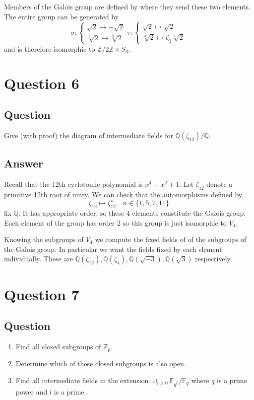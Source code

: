 \documentclass[11pt]{article}
\begin{document}
Members of the Galois group are defined  by where they send these two elements. The entire group can be generated by 
\[\sigma : \left\{ \begin{array}{c} \sqrt 2 \mapsto -\sqrt 2 \\ \sqrt[3]2 \mapsto \sqrt[3]2  \end{array}\right. \tau : \left\{ \begin{array}{c} \sqrt 2 \mapsto \sqrt 2 \\ \sqrt[3]2 \mapsto \zeta_3 \sqrt[3]2  \end{array}\right. \]
and is therefore isomorphic to $\mathbb{Z}/2 \mathbb{Z} \times S_3$.

\section{Question 6}
\subsection{Question}
Give (with proof) the diagram of intermediate fields for $\mathbb{Q}(\zeta_{12})/\mathbb{Q}$.
\subsection{Answer}
Recall that the 12th cyclotomic polynomial is $x^4-x^2+1$. Let $\zeta_{12}$ denote a primitive 12th root of unity. We can check that the automorphisms defined by
\[\zeta_{12} \mapsto \zeta_{12}^n \quad n \in \{ 1, 5, 7, 11\}\]
fix $\mathbb{Q}$. It has appropriate order, so these 4 elements constitute the Galois group. Each element of the group has order $2$ so this group is just isomorphic to $V_4$.

Knowing the subgroups of $V_4$ we compute the fixed fields of of the subgroups of the Galois group. In particular we want the fields fixed by each element individually. These are $\mathbb{Q}(\zeta_{12}) ,\mathbb{Q}(\zeta_{4}) ,\mathbb{Q}(\sqrt{-3}) ,\mathbb{Q}(\sqrt3)$ respectively.


\section{Question 7}
\subsection{Question}
\begin{enumerate}
\item Find all closed subgroups of $\mathbb{Z}_p$.
\item Determine which of these closed subgroups is also open.
\item Find all intermediate fields in the extension $\cup_{i\geq 0}\mathbb{F}_{q^{l^i}}/\mathbb{F}_q$ where $q$ is a prime power and $l$ is a prime.
\end{enumerate}
\end{document}
